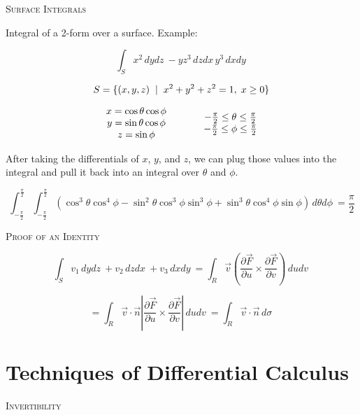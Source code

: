\documentclass{article}
\begin{document}
\bigskip

\textsc{Surface Integrals}

Integral of a 2-form over a surface.  Example:

\[
\int_S x^2\,dydz\ - yz^3\,dzdx\, y^3\,dxdy\
\]

\[
S = \{ (x, y, z) \hspace{2mm} \lvert \hspace{2mm} x^2 + y^2 + z^2 = 1, \hspace{1mm} x \ge 0 \}
\]

\[
\begin{array}{c}
 x = \cos{\theta}\cos{\phi}  \\
 y = \sin{\theta}\cos{\phi}  \\
 z = \sin{\phi}
\end{array} \hspace{10mm} \begin{array}{c}
 -\frac{\pi}{2} \le \theta \le \frac{\pi}{2}  \\
 -\frac{\pi}{2} \le \phi \le \frac{\pi}{2} 
\end{array}
\]

After taking the differentials of $x$, $y$, and $z$, we can plug those values into the integral and pull it back into an integral over $\theta$ and $\phi$.

\[
\int_{-\frac{\pi}{2}}^{\frac{\pi}{2}} \int_{-\frac{\pi}{2}}^{\frac{\pi}{2}} \left( \cos^3{\theta}\cos^4{\phi} - \sin^2{\theta}\cos^3{\phi}\sin^3{\phi} + \sin^3{\theta}\cos^4{\phi}\sin{\phi} \right) \,d\theta d\phi\ = \frac{\pi}{2}
\]

\bigskip

\textsc{Proof of an Identity}

\[
\int_S v_1\,dydz\ + v_2\,dzdx\ + v_3\,dxdy\ = \int_R \vec{v}\left(\frac{\partial{\vec{F}}}{\partial{u}} \times \frac{\partial{\vec{F}}}{\partial{v}} \right) \,dudv\
\]

\[
= \int_R \vec{v} \cdot \vec{n} \left| \frac{\partial{\vec{F}}}{\partial{u}} \times \frac{\partial{\vec{F}}}{\partial{v}} \right| \,dudv\ = \int_R \vec{v} \cdot \vec{n} \,d\sigma\
\]

\bigskip

\section{Techniques of Differential Calculus}

\textsc{Invertibility}

\smallskip
\end{document}
